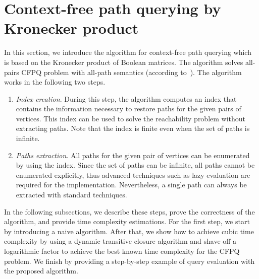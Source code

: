 \section{Context-free path querying by Kronecker product}


In this section, we introduce the algorithm for context-free path querying which is based on the Kronecker product of Boolean matrices.
The algorithm solves all-pairs CFPQ problem with all-path semantics (according to~\cite{hellingsPathQuerying}).
The algorithm works in the following two steps.
\begin{enumerate}
\item \emph{Index creation}.
 During this step, the algorithm computes an index that contains the information necessary to restore paths for the given pairs of vertices.
 This index can be used to solve the reachability problem without extracting paths.
 Note that the index is finite even when the set of paths is infinite.
\item \emph{Paths extraction}.
All paths for the given pair of vertices can be enumerated by using the index.
Since the set of paths can be infinite, all paths cannot be enumerated explicitly, thus advanced techniques such as lazy evaluation are required for the implementation.
Nevertheless, a single path can always be extracted with standard techniques.
\end{enumerate}

In the following subsections, we describe these steps, prove the correctness of the algorithm, and provide time complexity estimations.
For the first step, we start by introducing a naive algorithm.
After that, we show how to achieve cubic time complexity by using a dynamic transitive closure algorithm and shave off a logarithmic factor to achieve the best known time complexity for the CFPQ problem.
We finish by providing a step-by-step example of query evaluation with the proposed algorithm.



